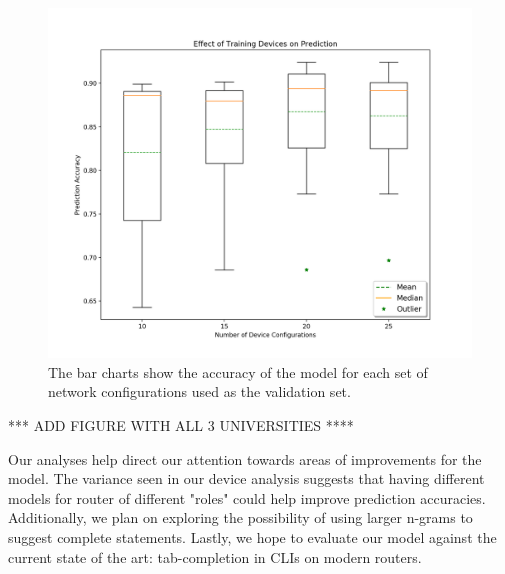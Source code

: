 \begin{figure}[H]
	\centering
	\includegraphics[width=\columnwidth]{umn_analysis.png}
	\caption{The bar charts show the accuracy of the model for each set of network configurations used as the validation set.}
    \label{fig:umn_analysis}
\end{figure}

*** ADD FIGURE WITH ALL 3 UNIVERSITIES ****

Our analyses help direct our attention towards areas of improvements for the model. The variance seen in our device analysis suggests that having different models for router of different "roles" could help improve prediction accuracies. Additionally, we plan on exploring the possibility of using larger n-grams to suggest complete statements. Lastly, we hope to evaluate our model against the current state of the art: tab-completion in CLIs on modern routers.
 
